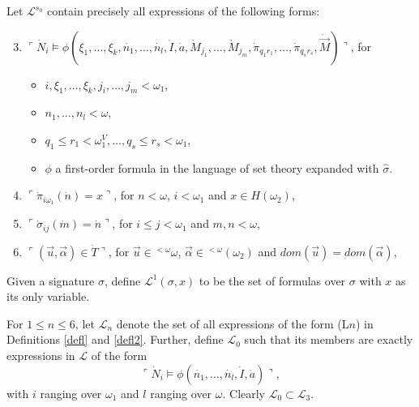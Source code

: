 \documentclass[12pt]{article}
\numberwithin{equation}{section}
\begin{document}
\begin{defi}
Let $\mathcal{L}^{s_0}$ contain precisely all expressions of the following forms:
\begin{enumerate}[label=(L\arabic*), leftmargin=40pt]
    \setcounter{enumi}{2}
    \item\label{l3} $\ulcorner \dot{N}_i \models \phi(\xi_1, \ldots, \xi_k, \dot{n_1}, \ldots, \dot{n_l}, \dot{I}, \dot{a}, \dot{M}_{j_1}, \ldots, \dot{M}_{j_m}, \dot{\pi}_{q_{1}r_{1}}, \ldots, \dot{\pi}_{q_{s}r_{s}}, \dot{\Vec{M}}) \urcorner$, for 
    \begin{itemize}[leftmargin=10pt]
        \item $i, \xi_1, \ldots, \xi_k, j_i, \ldots, j_m < \omega_1$,
        \item $n_1, \ldots, n_l < \omega$, 
        \item $q_1 \leq r_1 < \omega_1^V, \ldots, q_s \leq r_s < \omega_1$,
        \item $\phi$ a first-order formula in the language of set theory expanded with $\hat{\sigma}$.
    \end{itemize}
    \item\label{l4} $\ulcorner \dot{\pi}_{i\omega_1}(\dot{n}) = x \urcorner$, for $n < \omega$, $i < \omega_1$ and $x \in H(\omega_2)$,
    \item\label{l6} $\ulcorner \dot{\sigma}_{ij}(\dot{m}) = \dot{n} \urcorner$, for $i \leq j < \omega_1$ and $m, n < \omega$, 
    \item\label{l7} $\ulcorner (\Vec{u}, \Vec{\alpha}) \in \dot{T} \urcorner$, for $\Vec{u} \in {^{<\omega}{\omega}}$, $\Vec{\alpha} \in {^{<\omega}{(\omega_2)}}$ and $dom(\Vec{u}) = dom(\Vec{\alpha})$,
\end{enumerate}
\end{defi}

\begin{defi}\label{defsvf}
Given a signature $\sigma$, define $\mathcal{L}^1(\sigma, x)$ to be the set of formulas over $\sigma$ with $x$ as its only variable.
\end{defi}

\begin{defi}\label{subn}
For $1 \leq n \leq 6$, let $\mathcal{L}_n$ denote the set of all expressions of the form (L$n$) in Definitions \ref{defl} and \ref{defl2}. Further, define $\mathcal{L}_0$ such that its members are exactly expressions in $\mathcal{L}$ of the form 
\begin{equation*}
    \ulcorner \dot{N}_i \models \phi(\dot{n_1}, \ldots, \dot{n_l}, \dot{I}, \dot{a}) \urcorner,
\end{equation*}
with $i$ ranging over $\omega_1$ and $l$ ranging over $\omega$. Clearly $\mathcal{L}_0 \subset \mathcal{L}_3$.
\end{defi}
\end{document}
